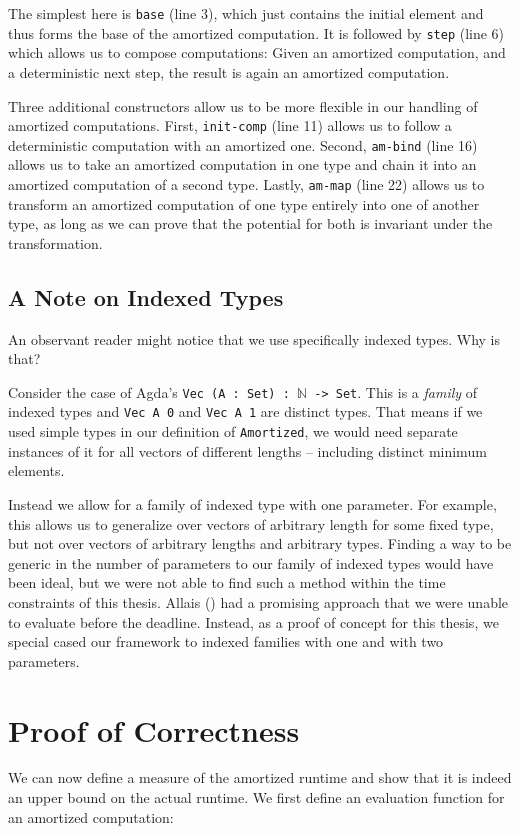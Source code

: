 The simplest here is \texttt{base} (line 3), which just contains the initial element and thus forms the base of the amortized computation. It is followed by \texttt{step} (line 6) which allows us to compose computations: Given an amortized computation, and a deterministic next step, the result is again an amortized computation.

Three additional constructors allow us to be more flexible in our handling of amortized computations. First, \texttt{init-comp} (line 11) allows us to follow a deterministic computation with an amortized one. Second, \texttt{am-bind} (line 16) allows us to take an amortized computation in one type and chain it into an amortized computation of a second type. Lastly, \texttt{am-map} (line 22) allows us to transform an amortized computation of one type entirely into one of another type, as long as we can prove that the potential for both is invariant under the transformation.

\subsection{A Note on Indexed Types}
An observant reader might notice that we use specifically indexed types. Why is that?

Consider the case of Agda's \texttt{Vec (A : Set) : $\mathbb N$ -> Set}. This is a \emph{family} of indexed types and \texttt{Vec A 0} and \texttt{Vec A 1} are distinct types. That means if we used simple types in our definition of \texttt{Amortized}, we would need separate instances of it for all vectors of different lengths -- including distinct minimum elements.

Instead we allow for a family of indexed type with one parameter. For example, this allows us to generalize over vectors of arbitrary length for some fixed type, but not over vectors of arbitrary lengths and arbitrary types. Finding a way to be generic in the number of parameters to our family of indexed types would have been ideal, but we were not able to find such a method within the time constraints of this thesis. Allais (\cite{allais:2019:polymorphic-nary-functions}) had a promising approach that we were unable to evaluate before the deadline. Instead, as a proof of concept for this thesis, we special cased our framework to indexed families with one and with two parameters.

\section{Proof of Correctness}
We can now define a measure of the amortized runtime and show that it is indeed an upper bound on the actual runtime. We first define an evaluation function for an amortized computation:

